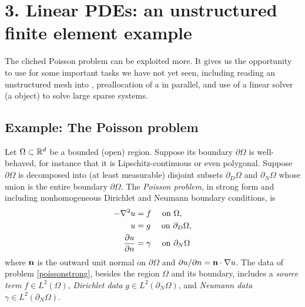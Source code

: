 
\chapter{3. Linear PDEs: an unstructured finite element example}

The cliched Poisson problem can be exploited more.  It gives us the opportunity to use \PETSc for some important tasks we have not yet seen, including reading an unstructured mesh into \PETSc \pVecs, preallocation of a \pMat in parallel, and use of a linear solver (a \pKSP object) to solve large sparse systems.

\section{Example: The Poisson problem}

Let $\Omega \subset \mathbb{R}^d$ be a bounded (open) region.  Suppose its boundary $\partial\Omega$ is well-behaved, for instance that it is Lipschitz-continuous \citep[section 1.2]{Ciarlet} or even polygonal.  Suppose $\partial\Omega$ is decomposed into (at least measurable) disjoint subsets $\partial_D \Omega$ and $\partial_N \Omega$ whose union is the entire boundary $\partial \Omega$.  The \emph{Poisson problem}, in strong form and including nonhomogeneous Dirichlet and Neumann boundary conditions, is
\begin{align}
- \nabla^2 u &= f \quad \text{ on } \Omega, \label{poissonstrong} \\
u &= g \quad \text{ on } \partial_D \Omega, \notag \\
\frac{\partial u}{\partial n} &= \gamma \quad \text{ on } \partial_N \Omega \notag
\end{align}
where $\mathbf{n}$ is the outward unit normal on $\partial \Omega$ and $\partial u/\partial n = \mathbf{n} \cdot \nabla u$.  The data of problem \eqref{poissonstrong}, besides the region $\Omega$ and its boundary, includes a \emph{source term} $f\in L^2(\Omega)$, \emph{Dirichlet data} $g\in L^2(\partial_N \Omega)$, and \emph{Neumann data} $\gamma\in L^2(\partial_N \Omega)$.

